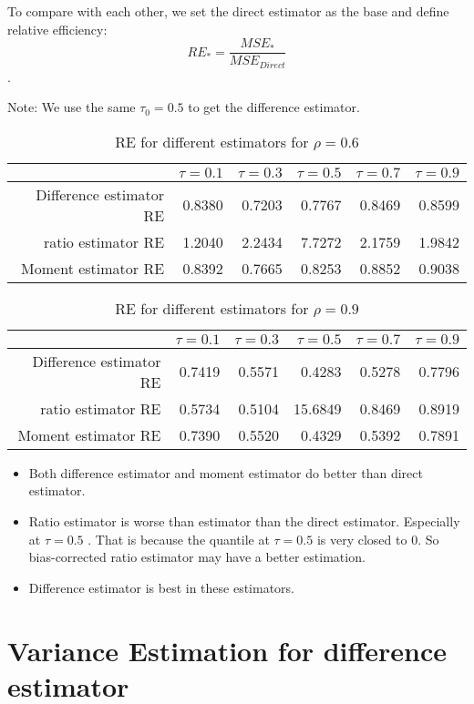 \documentclass[]{article}
\begin{document}
 To compare with each other, we set the direct estimator as the base and define relative efficiency: $$RE_{*}=\frac{MSE_{*}}{MSE_{Direct}}$$.
 
 Note: We use the same $\tau_0=0.5$ to get the difference estimator.
 
 \begin{table}[H]
 	\centering
 	\begin{tabular}{rrrrrr}
 		\hline
 		& $\tau=0.1$ & $\tau=0.3$ & $\tau=0.5$ & $\tau=0.7$ & $\tau=0.9$ \\ 
 		\hline
 		Difference estimator RE & 0.8380 & 0.7203 & 0.7767 & 0.8469 & 0.8599 \\ 
 		ratio estimator RE & 1.2040 & 2.2434 & 7.7272 & 2.1759 & 1.9842 \\ 
 		Moment estimator RE & 0.8392 & 0.7665 & 0.8253 & 0.8852 & 0.9038 \\ 
 		\hline
 	\end{tabular}
 	\caption{RE for different estimators for $\rho=0.6$}
 \end{table}
 
 \begin{table}[H]
 	\centering
 	\begin{tabular}{rrrrrr}
 		\hline
 		& $\tau=0.1$ & $\tau=0.3$ & $\tau=0.5$ & $\tau=0.7$ & $\tau=0.9$ \\ 
 		\hline
 		Difference estimator RE & 0.7419 & 0.5571 & 0.4283 & 0.5278 & 0.7796 \\ 
 		ratio estimator RE & 0.5734 & 0.5104 & 15.6849 & 0.8469 & 0.8919 \\ 
 		Moment estimator RE & 0.7390 & 0.5520 & 0.4329 & 0.5392 & 0.7891 \\ 
 		\hline
 	\end{tabular}
 	\caption{RE for different estimators for $\rho=0.9$}
 \end{table}
 \begin{itemize}
 	\item Both difference estimator and moment estimator do better than direct estimator.
 	\item Ratio estimator is worse than estimator than the direct estimator. Especially at $\tau=0.5$ . That is because the quantile at $\tau=0.5$ is very closed to 0. So bias-corrected ratio estimator may have a better estimation.
 	\item Difference estimator is best in these estimators.
 \end{itemize}
 
 \section{Variance Estimation for difference estimator}
 
\end{document}
